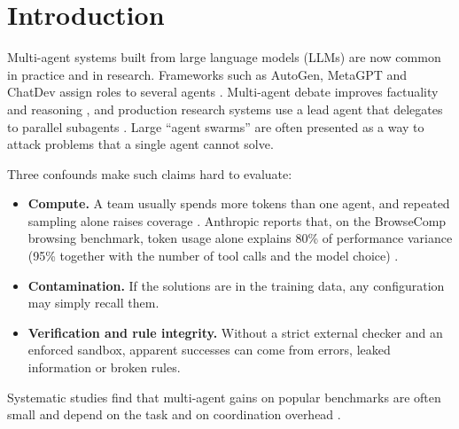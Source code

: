 \documentclass[11pt]{article}
\begin{document}
\section{Introduction}
Multi-agent systems built from large language models (LLMs) are now common in practice and in research. Frameworks
such as AutoGen, MetaGPT and ChatDev assign roles to several agents \citep{wu2023autogen,hong2023metagpt,qian2023chatdev}.
Multi-agent debate improves factuality and reasoning \citep{du2023debate}, and production research systems use a lead
agent that delegates to parallel subagents \citep{anthropic2025multiagent}. Large ``agent swarms'' are often presented
as a way to attack problems that a single agent cannot solve.

Three confounds make such claims hard to evaluate:
\begin{itemize}
  \item \textbf{Compute.} A team usually spends more tokens than one agent, and repeated sampling alone raises coverage
    \citep{wang2023selfconsistency,brown2024monkeys,li2024moreagents}. Anthropic reports that, on the BrowseComp browsing
    benchmark, token usage alone explains 80\% of performance variance (95\% together with the number of tool calls
    and the model choice) \citep{anthropic2025multiagent}.
  \item \textbf{Contamination.} If the solutions are in the training data, any configuration may simply recall them.
  \item \textbf{Verification and rule integrity.} Without a strict external checker and an enforced sandbox, apparent
    successes can come from errors, leaked information or broken rules.
\end{itemize}
Systematic studies find that multi-agent gains on popular benchmarks are often small \citep{cemri2025fail} and depend
on the task and on coordination overhead \citep{kim2025scaling}.
\end{document}
